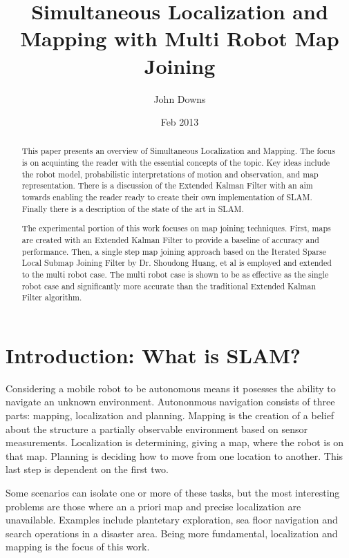 \documentclass[12pt]{report}
\title{Simultaneous Localization and Mapping with Multi Robot Map
  Joining}
\author{John Downs}
\date{Feb
  2013}
\begin{document}
\maketitle \tableofcontents

\begin{abstract}
  This paper presents an overview of Simultaneous Localization and
  Mapping. The focus is on acquinting the reader with the essential
  concepts of the topic. Key ideas include the robot model,
  probabilistic interpretations of motion and observation, and map
  representation. There is a discussion of the Extended Kalman Filter
  with an aim towards enabling the reader ready to create their own
  implementation of SLAM. Finally there is a description of the state
  of the art in SLAM.

  The experimental portion of this work focuses on map joining
  techniques. First, maps are created with an Extended Kalman Filter
  to provide a baseline of accuracy and performance. Then, a single
  step map joining approach based on the Iterated Sparse Local Submap
  Joining Filter by Dr. Shoudong Huang, et al is employed and extended
  to the multi robot case. The multi robot case is shown to be as
  effective as the single robot case and significantly more accurate
  than the traditional Extended Kalman Filter algorithm.

\end{abstract}
 
 
\chapter{Introduction: What is SLAM?}

Considering a mobile robot to be autonomous means it posesses the
ability to navigate an unknown environment. Autononmous navigation
consists of three parts: mapping, localization and planning.  Mapping
is the creation of a belief about the structure a partially observable
environment based on sensor measurements. Localization is determining,
giving a map, where the robot is on that map. Planning is deciding how
to move from one location to another. This last step is dependent on
the first two.

Some scenarios can isolate one or more of these tasks, but the most
interesting problems are those where an a priori map and precise
localization are unavailable. Examples include plantetary
exploration, sea floor navigation and search operations in a disaster
area. Being more fundamental, localization and mapping is the focus
of this work.
\end{document}
